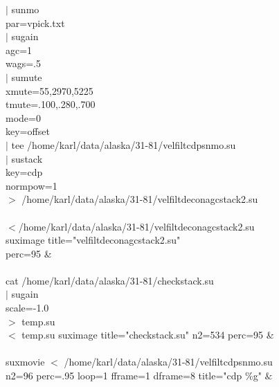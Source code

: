 $|$ sunmo \ \\
    par=vpick.txt \ \\
$|$ sugain \ \\
    agc=1 \ \\
    wags=.5 \ \\
$|$ sumute \ \\
    xmute=55,2970,5225 \ \\
    tmute=.100,.280,.700 \ \\
    mode=0 \ \\
    key=offset \ \\
$|$ tee /home/karl/data/alaska/31-81/velfiltcdpsnmo.su \ \\
$|$ sustack \ \\
    key=cdp \ \\
    normpow=1 \ \\
$>$ /home/karl/data/alaska/31-81/velfiltdeconagcstack2.su \\
 \\
$<$/home/karl/data/alaska/31-81/velfiltdeconagcstack2.su \ \\
 suximage title="velfiltdeconagcstack2.su" \ \\
	 perc=95 \& \\
 \\
cat /home/karl/data/alaska/31-81/checkstack.su \ \\
$|$ sugain \ \\
    scale=-1.0 \ \\
$>$ temp.su \\
$<$ temp.su suximage title="checkstack.su" n2=534 perc=95 \& \\
 \\
suxmovie $<$ /home/karl/data/alaska/31-81/velfiltcdpsnmo.su \ \\
    n2=96 perc=.95 loop=1 fframe=1 dframe=8 title="cdp \%g" $\&$